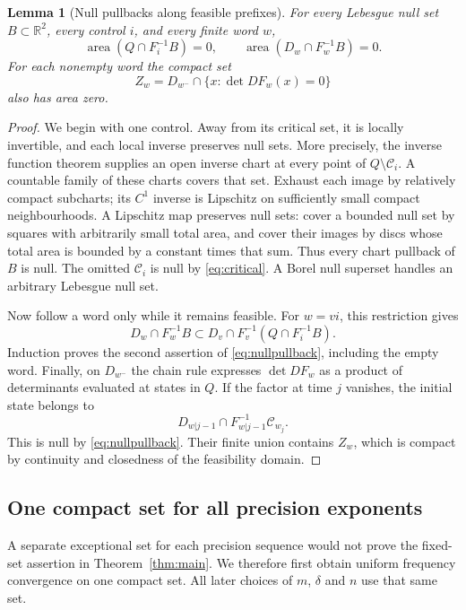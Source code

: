 \documentclass[11pt]{amsart}
\newtheorem{lemma}[theorem]{Lemma}
\theoremstyle{definition}
\theoremstyle{remark}
\newcommand{\R}{\mathbb R}
\newcommand{\area}{\operatorname{area}}
\numberwithin{equation}{section}
\begin{document}
\begin{lemma}[Null pullbacks along feasible prefixes]\label{lem:nullpullback}
For every Lebesgue null set \(B\subset\R^2\), every control \(i\),
and every finite word \(w\),
\begin{equation}\label{eq:nullpullback}
\area(Q\cap F_i^{-1}B)=0,\qquad
\area(D_w\cap F_w^{-1}B)=0.
\end{equation}
For each nonempty word the compact set
\begin{equation}\label{eq:compositecritical}
Z_w=D_{w^-}\cap\{x:\det DF_w(x)=0\}
\end{equation}
also has area zero.
\end{lemma}
\begin{proof}
We begin with one control. Away from its critical set, it is locally
invertible, and each local inverse preserves null sets. More
precisely, the inverse function theorem supplies an open inverse
chart at every point of \(Q\setminus\mathcal C_i\). A countable family of
these charts covers that set. Exhaust each image by relatively
compact subcharts; its \(C^1\) inverse is Lipschitz on sufficiently
small compact neighbourhoods. A Lipschitz map preserves null sets:
cover a bounded null set by squares with arbitrarily small total
area, and cover their images by discs whose total area is bounded
by a constant times that sum. Thus every chart pullback of \(B\)
is null. The omitted \(\mathcal C_i\) is null by
\eqref{eq:critical}. A Borel null superset handles an arbitrary
Lebesgue null set.

Now follow a word only while it remains feasible. For \(w=vi\),
this restriction gives
\[
D_w\cap F_w^{-1}B
\subset D_v\cap F_v^{-1}(Q\cap F_i^{-1}B).
\]
Induction proves the second assertion of \eqref{eq:nullpullback},
including the empty word.
Finally, on \(D_{w^-}\) the chain rule expresses \(\det DF_w\)
as a product of determinants evaluated at states in \(Q\).
If the factor at time \(j\) vanishes, the initial state belongs to
\[
D_{w|j-1}\cap F_{w|j-1}^{-1}\mathcal C_{w_j}.
\]
This is null by \eqref{eq:nullpullback}. Their finite union
contains \(Z_w\), which is compact by continuity and closedness
of the feasibility domain.
\end{proof}

\subsection{One compact set for all precision exponents}
A separate exceptional set for each precision sequence would not
prove the fixed-set assertion in Theorem~\ref{thm:main}. We
therefore first obtain uniform frequency convergence on one compact
set. All later choices of $m$, $\delta$ and $n$ use that same set.
\end{document}
